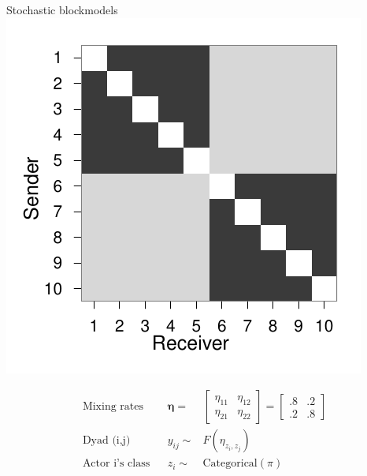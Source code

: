 \documentclass{beamer}
\begin{document}
\begin{frame}{Stochastic blockmodels}
\includegraphics[scale=.5]{../../figs/synthetic/bm} 

\vspace{-.8cm}
\begin{align*}
\mbox{Mixing rates} & & \boldsymbol{\eta} =& \left[
\begin {array}{cc}
 \eta_{11}& \eta_{12} \\
 \eta_{21}& \eta_{22} 
\end {array}
\right]
= \left[
\begin {array}{cc}
.8 & .2\\.2 & .8
\end {array}
\right] \\
\mbox{Dyad (i,j)} &  & y_{ij} \sim& F(\eta_{z_i,z_j}) \\
\mbox{Actor i's class} & & z_i \sim& \mbox{Categorical}(\pi)
\end{align*}

\end{frame}
\end{document}

